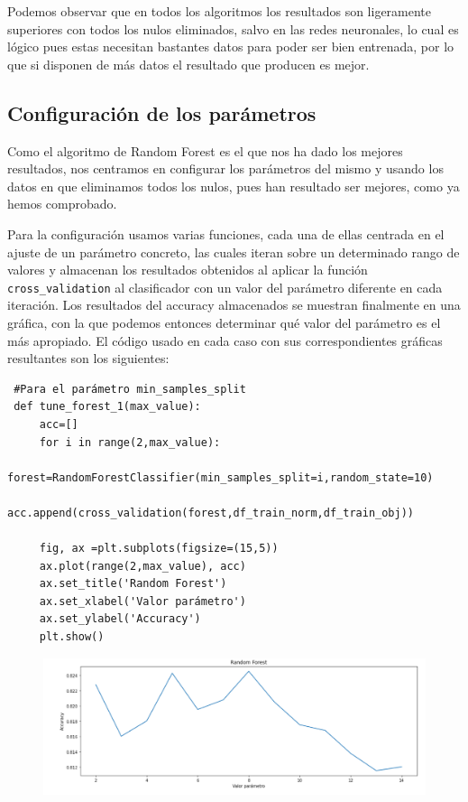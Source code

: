\documentclass[a4paper,11pt]{article}
\begin{document}
Podemos observar que en todos los algoritmos los resultados son ligeramente superiores con todos los nulos eliminados, salvo en las redes neuronales, lo cual es lógico pues estas necesitan bastantes datos para poder ser bien entrenada, por lo que si disponen de más datos el resultado que producen es mejor. 
\subsection{Configuración de los parámetros}
Como el algoritmo de Random Forest es el que nos ha dado los mejores resultados, nos centramos en configurar los parámetros del mismo y usando los datos en que eliminamos todos los nulos, pues han resultado ser mejores, como ya hemos comprobado. 

Para la configuración usamos varias funciones, cada una de ellas centrada en el ajuste de un parámetro concreto, las cuales iteran sobre un determinado rango de valores y almacenan los resultados obtenidos al aplicar la función \texttt{cross_validation} al clasificador con un valor del parámetro diferente en cada iteración. Los resultados del accuracy almacenados se muestran finalmente en una gráfica, con la que podemos entonces determinar qué valor del parámetro es el más apropiado.
El código usado en cada caso con sus correspondientes gráficas resultantes son los siguientes: 
 \begin{verbatim}
 #Para el parámetro min_samples_split
 def tune_forest_1(max_value):
	 acc=[]
	 for i in range(2,max_value):
		 forest=RandomForestClassifier(min_samples_split=i,random_state=10)
		 acc.append(cross_validation(forest,df_train_norm,df_train_obj))
		 
	 fig, ax =plt.subplots(figsize=(15,5))
	 ax.plot(range(2,max_value), acc)
	 ax.set_title('Random Forest')
	 ax.set_xlabel('Valor parámetro')
	 ax.set_ylabel('Accuracy')
	 plt.show()
 \end{verbatim}
 
 \begin{figure}[H]
 	\centering
 	\includegraphics[width=0.7\linewidth]{img/forest1}
 	\caption{}
 	\label{fig:forest1}
 \end{figure}
 
\end{document}
